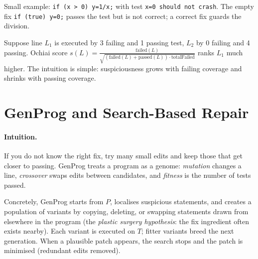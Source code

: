 Small example: \texttt{if (x > 0) y=1/x;} with test \texttt{x=0 should not crash}. The empty fix \texttt{if (true) y=0;} passes the test but is not correct; a correct fix guards the division.

\begin{example}
Suppose line $L_1$ is executed by 3 failing and 1 passing test, $L_2$ by 0 failing and 4 passing. Ochiai score $s(L)=\frac{\text{failed}(L)}{\sqrt{(\text{failed}(L)+\text{passed}(L))\cdot \text{totalFailed}}}$ ranks $L_1$ much higher. The intuition is simple: suspiciousness grows with failing coverage and shrinks with passing coverage.
\end{example}

\section{GenProg and Search-Based Repair}
\label{sec:genprog}
\paragraph{Intuition.} If you do not know the right fix, try many small edits and keep those that get closer to passing. GenProg treats a program as a genome: \emph{mutation} changes a line, \emph{crossover} swaps edits between candidates, and \emph{fitness} is the number of tests passed.

Concretely, GenProg starts from $P$, localises suspicious statements, and creates a population of variants by copying, deleting, or swapping statements drawn from elsewhere in the program (the \emph{plastic surgery hypothesis}: the fix ingredient often exists nearby). Each variant is executed on $T$; fitter variants breed the next generation. When a plausible patch appears, the search stops and the patch is minimised (redundant edits removed).

